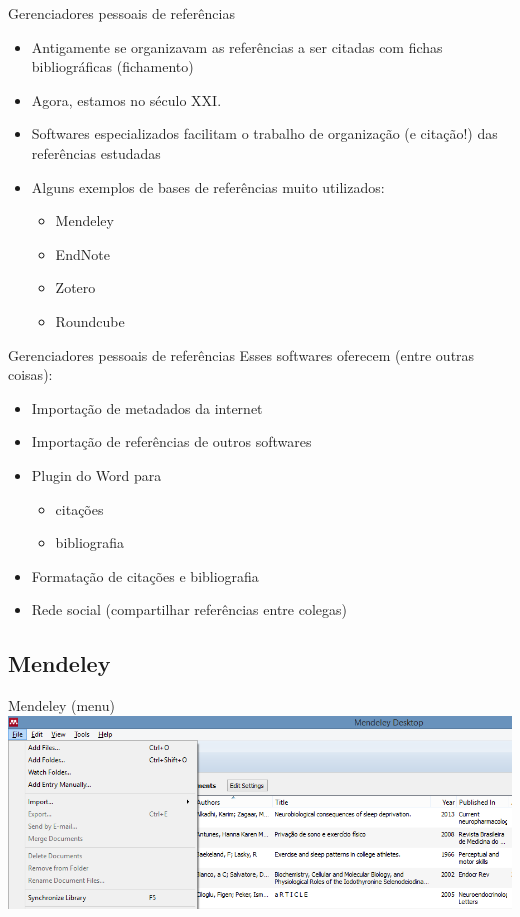 \documentclass{beamer}
\begin{document}
\begin{frame}{Gerenciadores pessoais de referências}
  \begin{itemize}
    \footnotesize
  \item Antigamente se organizavam as referências a ser citadas com
    fichas bibliográficas (fichamento)
  \item Agora, estamos no século XXI.
  \item Softwares especializados facilitam o trabalho de organização
    (e citação!) das referências estudadas
  \item Alguns exemplos de bases de referências muito utilizados:
    \begin{itemize}
      \scriptsize
    \item \alert<2->{Mendeley}
    \item EndNote
    \item Zotero
    \item Roundcube
    \end{itemize}
  \end{itemize}
\end{frame}

\begin{frame}{Gerenciadores pessoais de referências}
  Esses softwares oferecem (entre outras coisas):
  \begin{itemize}
    \footnotesize
  \item Importação de metadados da internet
  \item Importação de referências de outros softwares
  \item Plugin do Word para
    \begin{itemize}
      \scriptsize
    \item<2-> citações
    \item<2-> bibliografia
    \end{itemize}
  \item Formatação de citações e bibliografia
  \item Rede social (compartilhar referências entre colegas)
  \end{itemize}
\end{frame}

\subsection{Mendeley}

\begin{frame}{Mendeley (menu)}
  \centering
  \includegraphics[width=1.2\textwidth]{Referencias/mendeley-menu}
\end{frame}
\end{document}
